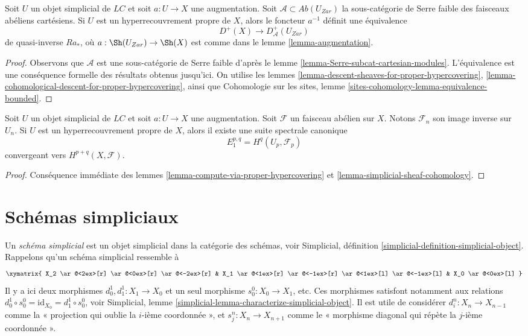 \begin{lemma}
\label{lemma-proper-hypercovering-equivalence-bounded}
Soit $U$ un objet simplicial de $\textit{LC}$ et soit $a : U \to X$
une augmentation.
Soit $\mathcal{A} \subset \textit{Ab}(U_{Zar})$
la sous-catégorie de Serre faible des faisceaux abéliens cartésiens.
Si $U$ est un hyperrecouvrement propre de $X$, alors
le foncteur $a^{-1}$ définit une équivalence
$$
D^+(X) \longrightarrow D_\mathcal{A}^+(U_{Zar})
$$
de quasi-inverse $Ra_*$, où $a : \Sh(U_{Zar}) \to \Sh(X)$
est comme dans le lemme \ref{lemma-augmentation}.
\end{lemma}

\begin{proof}
Observons que $\mathcal{A}$ est une sous-catégorie de Serre faible d'après le
lemme \ref{lemma-Serre-subcat-cartesian-modules}.
L'équivalence est une conséquence formelle
des résultats obtenus jusqu'ici. On utilise les
lemmes \ref{lemma-descent-sheaves-for-proper-hypercovering},
\ref{lemma-cohomological-descent-for-proper-hypercovering}, ainsi que
Cohomologie sur les sites, lemme \ref{sites-cohomology-lemma-equivalence-bounded}.
\end{proof}

\begin{lemma}
\label{lemma-spectral-sequence-proper-hypercovering}
Soit $U$ un objet simplicial de $\textit{LC}$ et soit
$a : U \to X$ une augmentation. Soit $\mathcal{F}$ un faisceau abélien
sur $X$. Notons $\mathcal{F}_n$ son image inverse sur $U_n$.
Si $U$ est un hyperrecouvrement propre de $X$, alors
il existe une suite spectrale canonique
$$
E_1^{p, q} = H^q(U_p, \mathcal{F}_p)
$$
convergeant vers $H^{p + q}(X, \mathcal{F})$.
\end{lemma}

\begin{proof}
Conséquence immédiate des lemmes \ref{lemma-compute-via-proper-hypercovering}
et \ref{lemma-simplicial-sheaf-cohomology}.
\end{proof}




\section{Schémas simpliciaux}
\label{section-simplicial}

\noindent
Un {\it schéma simplicial} est un objet simplicial dans la catégorie des schémas,
voir Simplicial, définition \ref{simplicial-definition-simplicial-object}.
Rappelons qu'un schéma simplicial ressemble à
$$
\xymatrix{
X_2
\ar@<2ex>[r]
\ar@<0ex>[r]
\ar@<-2ex>[r]
&
X_1
\ar@<1ex>[r]
\ar@<-1ex>[r]
\ar@<1ex>[l]
\ar@<-1ex>[l]
&
X_0
\ar@<0ex>[l]
}
$$
Il y a ici deux morphismes $d^1_0, d^1_1 : X_1 \to X_0$
et un seul morphisme $s^0_0 : X_0 \to X_1$, etc.
Ces morphismes satisfont notamment aux relations
$d^1_0 \circ s^0_0 = \text{id}_{X_0} = d^1_1 \circ s^0_0$, voir
Simplicial, lemme \ref{simplicial-lemma-characterize-simplicial-object}.
Il est utile de considérer $d^n_i : X_n \to X_{n - 1}$
comme la « projection qui oublie la $i$-ième coordonnée », et
$s^n_j : X_n \to X_{n + 1}$ comme le « morphisme diagonal qui répète
la $j$-ième coordonnée ».

